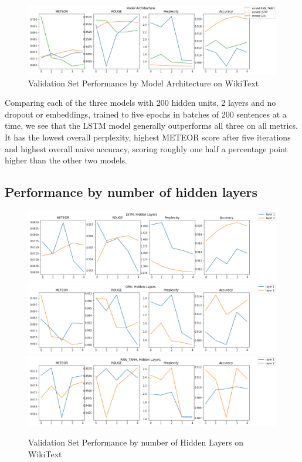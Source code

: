 \documentclass[a4paper]{article}
\begin{document}
\begin{figure}[!ht]
\includegraphics[width=0.7\columnwidth]{sr-perf-by-model-architecture}
\centering
\caption{Validation Set Performance by Model Architecture on WikiText}
\end{figure}

Comparing each of the three models with 200 hidden units, 2 layers and
no dropout or embeddings, trained to five epochs in batches of 200 sentences at a
time, we see that the LSTM model generally outperforms all three on all metrics.
It has the lowest overall perplexity, highest METEOR score after five iterations
and highest overall naive accuracy, scoring roughly one half a percentage point
higher than the other two models.

\subsection{Performance by number of hidden layers}
\label{sec:perf_by_n_layers}

\begin{figure}[!ht]
\includegraphics[width=0.7\columnwidth]{sr-perf-by-hidden-lstm}
\includegraphics[width=0.7\columnwidth]{sr-perf-by-hidden-gru}
\includegraphics[width=0.7\columnwidth]{sr-perf-by-hidden-rnn}
\centering
\caption{Validation Set Performance by number of Hidden Layers on WikiText}
\end{figure}
\end{document}
